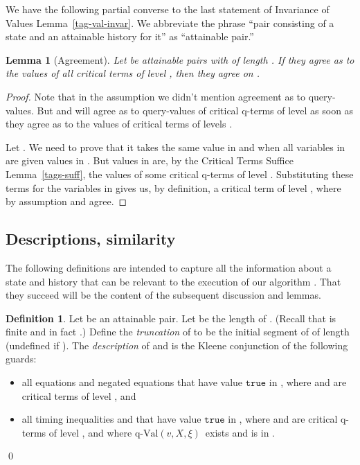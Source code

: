 \documentclass{LMCS}
\newtheorem{la}[thm]{Lemma}
\theoremstyle{definition}
\newtheorem{df}[thm]{Definition}
\newenvironment{ls}{\begin{itemize}}{\end{itemize}}
\newcommand{\qval}[3]{\ensuremath{\text{q-Val}(#1,#2,#3)}}
\newcommand{\ttt}[1]{\ensuremath{\mathtt {#1}}}
\begin{document}
We have the following partial converse to the last statement of
Invariance of Values Lemma~\ref{tag-val-invar}.  We abbreviate the
phrase ``pair consisting of a state and an attainable history for it''
as ``attainable pair.''

\begin{la}[Agreement]\label{lemma:agree}
Let  be attainable pairs with  of length .
If they agree as to the values of all critical terms of level
, then they agree on .
\end{la}

\begin{proof}
Note that in the assumption we didn't mention agreement as to
query-values. But  and  will agree as to
query-values of critical q-terms of level  as soon as they agree as
to the values of critical terms of levels .

Let . We need to prove that it takes the same value in
 and  when all variables in  are given values
in . But values in  are, by the
Critical Terms Suffice Lemma~\ref{tags-suff}, the values of some
critical q-terms of level . Substituting these terms for the
variables in  gives us, by definition, a critical term of level
, where by assumption  and  agree.
\end{proof}

\subsection{Descriptions, similarity}

The following definitions are intended to capture all the information
about a state and history that can be relevant to the execution of our
algorithm .  That they succeed will be the content of the subsequent
discussion and lemmas.

\begin{df}
Let  be an attainable pair.  Let  be
the length of .  (Recall that  is finite and in fact .)  Define the \emph{truncation}  of  to be the initial
segment of  of length  (undefined if ).  The
\emph{description}  of  and  is the Kleene
conjunction of the following guards:
\begin{ls}
\item all equations  and negated equations  that have
  value \ttt{true} in , where  and  are critical terms
  of level , and
\item all timing inequalities  and  that
  have value \ttt{true} in , where  and  are critical
  q-terms of level , and where \qval vX\xi\ exists and is in
  .
\end{ls}
\qed\end{df}
\end{document}
